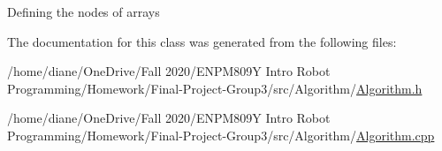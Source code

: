 Defining the nodes of arrays 

The documentation for this class was generated from the following files\+:\begin{DoxyCompactItemize}
\item 
/home/diane/\+One\+Drive/\+Fall 2020/\+E\+N\+P\+M809\+Y Intro Robot Programming/\+Homework/\+Final-\/\+Project-\/\+Group3/src/\+Algorithm/\hyperlink{_algorithm_8h}{Algorithm.\+h}\item 
/home/diane/\+One\+Drive/\+Fall 2020/\+E\+N\+P\+M809\+Y Intro Robot Programming/\+Homework/\+Final-\/\+Project-\/\+Group3/src/\+Algorithm/\hyperlink{_algorithm_8cpp}{Algorithm.\+cpp}\end{DoxyCompactItemize}
